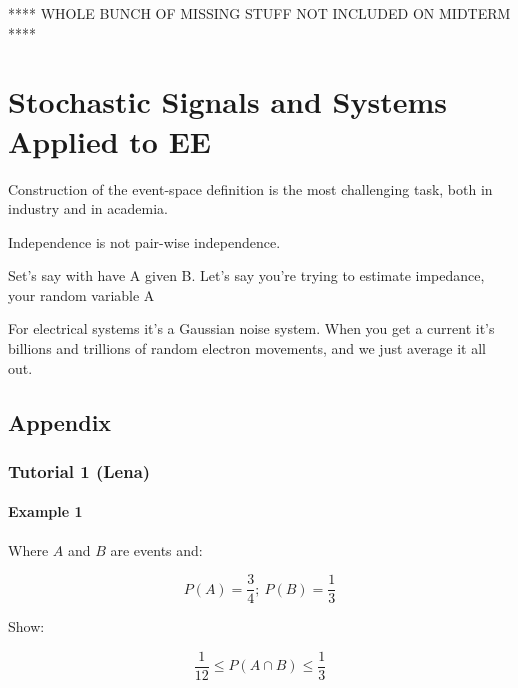 \documentclass{report}
\renewcommand\appendix{\par
  \setcounter{section}{0}
  \setcounter{subsection}{0}
  \setcounter{figure}{0}
  \setcounter{table}{0}
  \renewcommand\thesection{Appendix \Alph{section}}
  \renewcommand\thefigure{\Alph{section}\arabic{figure}}
  \renewcommand\thetable{\Alph{section}\arabic{table}}
}
\begin{document}
**** WHOLE BUNCH OF MISSING STUFF NOT INCLUDED ON MIDTERM ****

\chapter{Stochastic Signals and Systems Applied to EE}

\newpage


Construction of the event-space definition is the most challenging task, both in industry and in academia. 


Independence is not pair-wise independence.


Set's say with have A given B. Let's say you're trying to estimate impedance, your random variable A 

For electrical systems it's a Gaussian noise system. When you get a current it's billions and trillions of random electron movements, and we just average it all out. 











\newpage

 
\pagebreak


\appendix
\onehalfspacing
\section*{Appendix}
\renewcommand{\thesubsection}{\Alph{subsection}}


\subsection{Tutorial 1 (Lena)}

\subsubsection*{Example 1}

Where $A$ and $B$ are events and:

$$P(A) = \frac{3}{4};\ P(B)=\frac{1}{3}$$

Show:

$$\frac{1}{12} \leq P(A \cap B) \leq \frac{1}{3}$$
\end{document}
